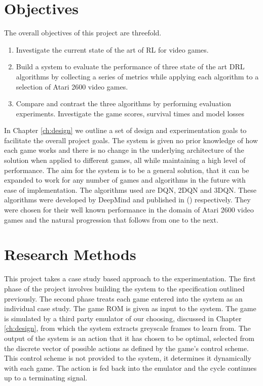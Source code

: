 \section{Objectives}
The overall objectives of this project are threefold. 

\begin{enumerate}
	\item Investigate the current state of the art of RL for video games.
	\item Build a system to evaluate the performance of three state of the art DRL algorithms by collecting a series of metrics while applying each algorithm to a selection of Atari 2600 video games. 
	\item Compare and contrast the three algorithms by performing evaluation experiments. Investigate the game scores, survival times and model losses
\end{enumerate}

In Chapter \ref{ch:design} we outline a set of design and experimentation goals to facilitate the overall project goals. The system is given no prior knowledge of how each game works and there is no change in the underlying architecture of the solution when applied to different games, all while maintaining a high level of performance. The aim for the system is to be a general solution, that it can be expanded to work for any number of games and algorithms in the future with ease of implementation. The algorithms used are DQN, 2DQN and 3DQN. These algorithms were developed by DeepMind and published in (\citet{deepmind1,doubleq,dueling}) respectively. They were chosen for their well known performance in the domain of Atari 2600 video games and the natural progression that follows from one to the next.

\section{Research Methods}
This project takes a case study based approach to the experimentation. The first phase of the project involves building the system to the specification outlined previously. The second phase treats each game entered into the system as an individual case study. The game ROM is given as input to the system. The game is simulated by a third party emulator of our choosing, discussed in Chapter \ref{ch:design}, from which the system extracts greyscale frames to learn from. The output of the system is an action that it has chosen to be optimal, selected from the discrete vector of possible actions as defined by the game's control scheme. This control scheme is not provided to the system, it determines it dynamically with each game. The action is fed back into the emulator and the cycle continues up to a terminating signal.

